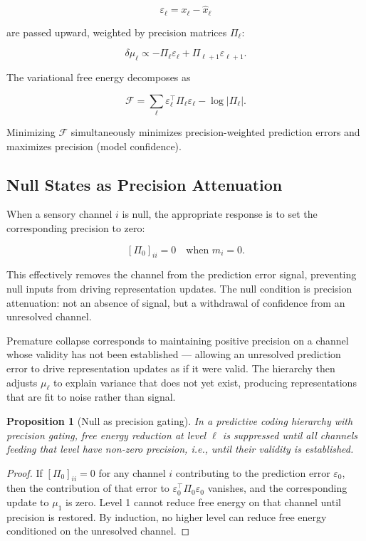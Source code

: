 \documentclass[11pt]{article}
\newtheorem{proposition}{Proposition}
\theoremstyle{remark}
\begin{document}
\[
\varepsilon_\ell = x_\ell - \hat{x}_\ell
\]

are passed upward, weighted by precision matrices $\Pi_\ell$:

\[
\delta\mu_\ell \propto -\Pi_\ell \varepsilon_\ell + \Pi_{\ell+1}\varepsilon_{\ell+1}.
\]

The variational free energy decomposes as

\[
\mathcal{F} = \sum_\ell \varepsilon_\ell^\top \Pi_\ell \varepsilon_\ell - \log |\Pi_\ell|.
\]

Minimizing $\mathcal{F}$ simultaneously minimizes precision-weighted prediction errors and maximizes precision (model confidence).

\subsection{Null States as Precision Attenuation}

When a sensory channel $i$ is null, the appropriate response is to set the corresponding precision to zero:

\[
[\Pi_0]_{ii} = 0 \quad \text{when } m_i = 0.
\]

This effectively removes the channel from the prediction error signal, preventing null inputs from driving representation updates. The null condition is precision attenuation: not an absence of signal, but a withdrawal of confidence from an unresolved channel.

Premature collapse corresponds to maintaining positive precision on a channel whose validity has not been established --- allowing an unresolved prediction error to drive representation updates as if it were valid. The hierarchy then adjusts $\mu_\ell$ to explain variance that does not yet exist, producing representations that are fit to noise rather than signal.

\begin{proposition}[Null as precision gating]
In a predictive coding hierarchy with precision gating, free energy reduction at level $\ell$ is suppressed until all channels feeding that level have non-zero precision, i.e., until their validity is established.
\end{proposition}

\begin{proof}
If $[\Pi_0]_{ii} = 0$ for any channel $i$ contributing to the prediction error $\varepsilon_0$, then the contribution of that error to $\varepsilon_0^\top \Pi_0 \varepsilon_0$ vanishes, and the corresponding update to $\mu_1$ is zero. Level 1 cannot reduce free energy on that channel until precision is restored. By induction, no higher level can reduce free energy conditioned on the unresolved channel.
\end{proof}
\end{document}

